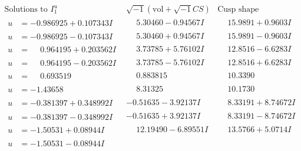 \documentclass[1p]{elsarticle_modified}
\theoremstyle{definition}
\newcommand{\I}{\sqrt{-1}}
\begin{document}
$$\begin{array}{c|c|c}  
\text{Solutions to }I^u_{1}& \I (\text{vol} + \sqrt{-1}CS) & \text{Cusp shape}\\
 \hline 
\begin{aligned}
u &= -0.986925 + 0.107343 I\end{aligned}
 & \phantom{-}5.30460 - 0.94567 I & \phantom{-}15.9891 + 0.9603 I \\ \hline\begin{aligned}
u &= -0.986925 - 0.107343 I\end{aligned}
 & \phantom{-}5.30460 + 0.94567 I & \phantom{-}15.9891 - 0.9603 I \\ \hline\begin{aligned}
u &= \phantom{-}0.964195 + 0.203562 I\end{aligned}
 & \phantom{-}3.73785 + 5.76102 I & \phantom{-}12.8516 - 6.6283 I \\ \hline\begin{aligned}
u &= \phantom{-}0.964195 - 0.203562 I\end{aligned}
 & \phantom{-}3.73785 - 5.76102 I & \phantom{-}12.8516 + 6.6283 I \\ \hline\begin{aligned}
u &= \phantom{-}0.693519\phantom{ +0.000000I}\end{aligned}
 & \phantom{-}0.883815\phantom{ +0.000000I} & \phantom{-}10.3390\phantom{ +0.000000I} \\ \hline\begin{aligned}
u &= -1.43658\phantom{ +0.000000I}\end{aligned}
 & \phantom{-}8.31325\phantom{ +0.000000I} & \phantom{-}10.1730\phantom{ +0.000000I} \\ \hline\begin{aligned}
u &= -0.381397 + 0.348992 I\end{aligned}
 & -0.51635 - 3.92137 I & \phantom{-}8.33191 + 8.74672 I \\ \hline\begin{aligned}
u &= -0.381397 - 0.348992 I\end{aligned}
 & -0.51635 + 3.92137 I & \phantom{-}8.33191 - 8.74672 I \\ \hline\begin{aligned}
u &= -1.50531 + 0.08944 I\end{aligned}
 & \phantom{-}12.19490 - 6.89551 I & \phantom{-}13.5766 + 5.0714 I \\ \hline\begin{aligned}
u &= -1.50531 - 0.08944 I\end{aligned}

\end{array}$$
\end{document}
